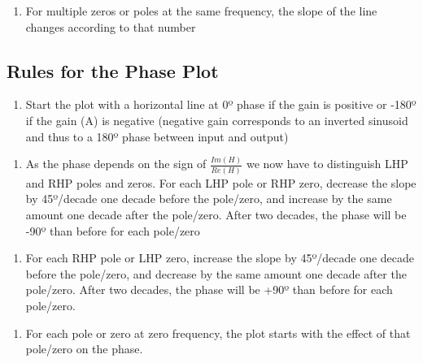\documentclass[11pt]{article}
\providecommand{\tightlist}{%
      \setlength{\itemsep}{0pt}\setlength{\parskip}{0pt}}
\begin{document}
\begin{enumerate}
\def\labelenumi{\arabic{enumi}.}
\setcounter{enumi}{5}
\tightlist
\item
  For multiple zeros or poles at the same frequency, the slope of the
  line changes according to that number
\end{enumerate}

\subsection{Rules for the Phase Plot}\label{rules-for-the-phase-plot}

\begin{enumerate}
\def\labelenumi{\arabic{enumi}.}
\tightlist
\item
  Start the plot with a horizontal line at 0º phase if the gain is
  positive or -180º if the gain (A) is negative (negative gain
  corresponds to an inverted sinusoid and thus to a 180º phase between
  input and output)
\end{enumerate}

\begin{enumerate}
\def\labelenumi{\arabic{enumi}.}
\setcounter{enumi}{1}
\tightlist
\item
  As the phase depends on the sign of \(\frac{Im(H)}{Re(H)}\) we now
  have to distinguish LHP and RHP poles and zeros. For each LHP pole or
  RHP zero, decrease the slope by 45º/decade one decade before the
  pole/zero, and increase by the same amount one decade after the
  pole/zero. After two decades, the phase will be -90º than before for
  each pole/zero
\end{enumerate}

\begin{enumerate}
\def\labelenumi{\arabic{enumi}.}
\setcounter{enumi}{2}
\tightlist
\item
  For each RHP pole or LHP zero, increase the slope by 45º/decade one
  decade before the pole/zero, and decrease by the same amount one
  decade after the pole/zero. After two decades, the phase will be +90º
  than before for each pole/zero.
\end{enumerate}

\begin{enumerate}
\def\labelenumi{\arabic{enumi}.}
\setcounter{enumi}{3}
\tightlist
\item
  For each pole or zero at zero frequency, the plot starts with the
  effect of that pole/zero on the phase.
\end{enumerate}
\end{document}
